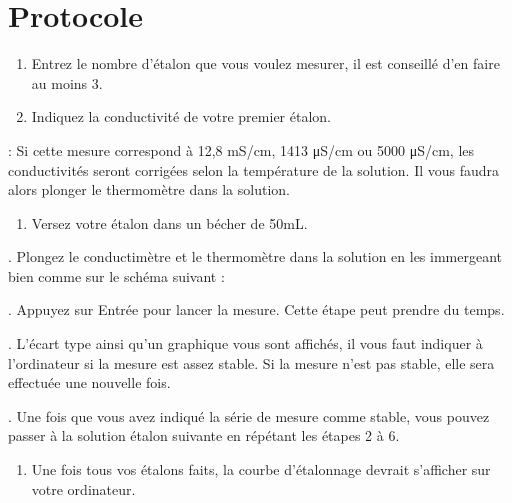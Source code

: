 \documentclass[letterpaper,10pt,french]{sphinxmanual}
\begin{document}
\section{Protocole}
\label{\detokenize{Etalonnage:protocole}}\begin{enumerate}
%
\item {} 
\sphinxAtStartPar
Entrez le nombre d’étalon que vous voulez mesurer, il est conseillé d’en faire au moins 3.

\item {} 
\sphinxAtStartPar
Indiquez la conductivité de votre premier étalon.

\end{enumerate}

\sphinxAtStartPar
{} : Si cette mesure correspond à 12,8 mS/cm, 1413 μS/cm ou 5000 μS/cm, les
conductivités seront corrigées selon la température de la solution. Il vous faudra alors
plonger le thermomètre dans la solution.
\begin{enumerate}
%
\setcounter{enumi}{2}
\item {} 
\sphinxAtStartPar
Versez votre étalon dans un bécher de 50mL.

\end{enumerate}

. Plongez le conductimètre et le thermomètre dans la solution en les immergeant bien
comme sur le schéma suivant :

\begin{figure}[htbp]
\centering

\noindent{}
\end{figure}

. Appuyez sur Entrée pour lancer la mesure.
Cette étape peut prendre du temps.

. L’écart type ainsi qu’un graphique vous sont affichés, il vous faut indiquer à l’ordinateur si la
mesure est assez stable.
Si la mesure n’est pas stable, elle sera effectuée une nouvelle fois.

. Une fois que vous avez indiqué la série de mesure comme stable, vous pouvez passer à la
solution étalon suivante en répétant les étapes 2 à 6.
\begin{enumerate}
%
\setcounter{enumi}{7}
\item {} 
\sphinxAtStartPar
Une fois tous vos étalons faits, la courbe d’étalonnage devrait s’afficher sur votre ordinateur.

\end{enumerate}
\end{document}
